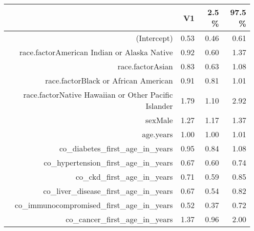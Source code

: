 \begin{table}[ht]
\centering
\begin{tabular}{rrrr}
  \hline
 & V1 & 2.5 \% & 97.5 \% \\ 
  \hline
(Intercept) & 0.53 & 0.46 & 0.61 \\ 
  race.factorAmerican Indian or Alaska Native & 0.92 & 0.60 & 1.37 \\ 
  race.factorAsian & 0.83 & 0.63 & 1.08 \\ 
  race.factorBlack or African American & 0.91 & 0.81 & 1.01 \\ 
  race.factorNative Hawaiian or Other Pacific Islander & 1.79 & 1.10 & 2.92 \\ 
  sexMale & 1.27 & 1.17 & 1.37 \\ 
  age.years & 1.00 & 1.00 & 1.01 \\ 
  co\_diabetes\_first\_age\_in\_years & 0.95 & 0.84 & 1.08 \\ 
  co\_hypertension\_first\_age\_in\_years & 0.67 & 0.60 & 0.74 \\ 
  co\_ckd\_first\_age\_in\_years & 0.71 & 0.59 & 0.85 \\ 
  co\_liver\_disease\_first\_age\_in\_years & 0.67 & 0.54 & 0.82 \\ 
  co\_immunocompromised\_first\_age\_in\_years & 0.52 & 0.37 & 0.72 \\ 
  co\_cancer\_first\_age\_in\_years & 1.37 & 0.96 & 2.00 \\ 
   \hline
\end{tabular}
\end{table}
